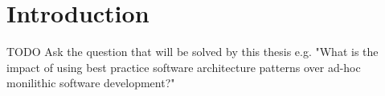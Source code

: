 \chapter{Introduction}

TODO Ask the question that will be solved by this thesis
e.g. "What is the impact of using best practice software architecture patterns over ad-hoc monilithic software development?"